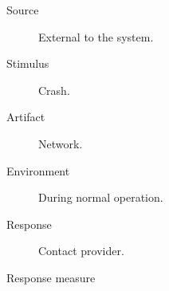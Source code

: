 \begin{description}
	\item[Source] External to the system.
	\item[Stimulus] Crash.
	\item[Artifact] Network.
	\item[Environment] During normal operation.
	\item[Response] Contact provider.
	\item[Response measure] \ %
\end{description}
